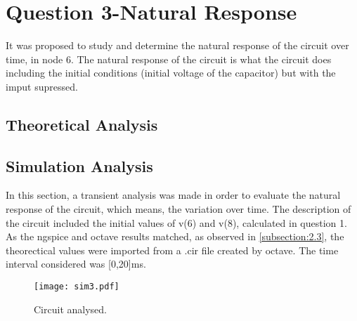 \section{Question 3-Natural Response}
It was proposed to study and determine the natural response of the circuit over time, in node 6. The natural response of the circuit is what the circuit does including the initial conditions (initial voltage of the capacitor) but with the imput supressed. 

\subsection{Theoretical Analysis}




\subsection{Simulation Analysis}
In this section, a transient analysis was made in order to evaluate the natural response of the circuit, which means, the variation over time. The description of the circuit included the initial values of v(6) and v(8), calculated in question 1. As the ngspice and octave results matched, as observed in \ref{subsection:2.3}, the theorectical values were imported from a .cir file created by octave.
The time interval considered was [0,20]ms.
\begin{figure}[ht] \centering
\texttt{[image: sim3.pdf]}
\caption{Circuit analysed.}
\label{fig:sim3}
\end{figure}

